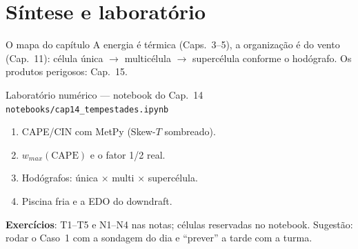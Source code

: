 \documentclass[aspectratio=169,11pt]{beamer}
\begin{document}
\section{Síntese e laboratório}

\begin{frame}{O mapa do capítulo}
  \vspace{0.6em}
  A energia é térmica (Caps.~3--5), a organização é do vento
  (Cap.~11): célula única $\to$ multicélula $\to$ supercélula conforme
  o hodógrafo. Os produtos perigosos: Cap.~15.
\end{frame}

\begin{frame}{Laboratório numérico --- notebook do Cap.~14}
  \texttt{notebooks/cap14\_tempestades.ipynb}
  \begin{enumerate}
    \item CAPE/CIN com MetPy (Skew-$T$ sombreado).
    \item $w_{max}(\mathrm{CAPE})$ e o fator 1/2 real.
    \item Hodógrafos: única × multi × supercélula.
    \item Piscina fria e a EDO do downdraft.
  \end{enumerate}
  \vspace{0.4em}
  \textbf{Exercícios}: T1--T5 e N1--N4 nas notas; células reservadas no
  notebook. Sugestão: rodar o Caso~1 com a sondagem do dia e
  ``prever'' a tarde com a turma.
  \vfill
  \atribuicao
\end{frame}
\end{document}

